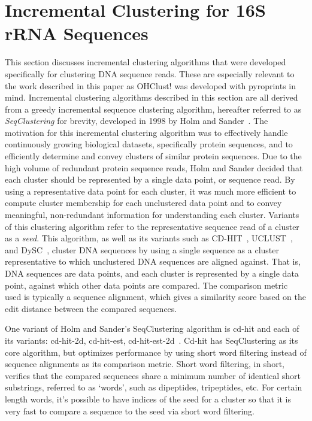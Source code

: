 \documentclass[12pt]{ucthesis}
\begin{document}
   \section{Incremental Clustering for 16S rRNA Sequences}\label{sec:seq_incr_cluster}
   This section discusses incremental clustering algorithms that were
   developed specifically for clustering DNA sequence reads. These are
   especially relevant to the work described in this paper as OHClust! was
   developed with pyroprints in mind. Incremental clustering algorithms
   described in this section are all derived from a greedy incremental sequence
   clustering algorithm, hereafter referred to as \textit{SeqClustering} for
   brevity, developed in 1998 by Holm and Sander~\cite{Holm:Greedy}. The
   motivation for this incremental clustering algorithm was to effectively
   handle continuously growing biological datasets, specifically protein
   sequences, and to efficiently determine and convey clusters of similar
   protein sequences. Due to the high volume of redundant protein sequence
   reads, Holm and Sander decided that each cluster should be represented by a
   single data point, or sequence read. By using a representative data point
   for each cluster, it was much more efficient to compute cluster membership
   for each unclustered data point and to convey meaningful, non-redundant
   information for understanding each cluster. Variants of this clustering
   algorithm refer to the representative sequence read of a cluster as a
   \textit{seed}. This algorithm, as well as its variants such as
   CD-HIT~\cite{Li:CD_Hit}, UCLUST~\cite{Edgar:UCLUST}, and
   DySC~\cite{Zheng:DySC}, cluster DNA sequences by using a single sequence as
   a cluster representative to which unclustered DNA sequences are aligned
   against. That is, DNA sequences are data points, and each cluster is
   represented by a single data point, against which other data points are
   compared. The comparison metric used is typically a sequence alignment,
   which gives a similarity score based on the edit distance between the
   compared sequences.

   One variant of Holm and Sander's SeqClustering algorithm is cd-hit and each
   of its variants: cd-hit-2d, cd-hit-est, cd-hit-est-2d~\cite{Li:CD_Hit,
   Li:Redundancy}. Cd-hit has SeqClustering as its core algorithm, but
   optimizes performance by using short word filtering instead of sequence
   alignments as its comparison metric. Short word filtering, in short,
   verifies that the compared sequences share a minimum number of identical
   short substrings, referred to as `words', such as dipeptides, tripeptides,
   etc. For certain length words, it's possible to have indices of the seed for
   a cluster so that it is very fast to compare a sequence to the seed via
   short word filtering.
\end{document}
